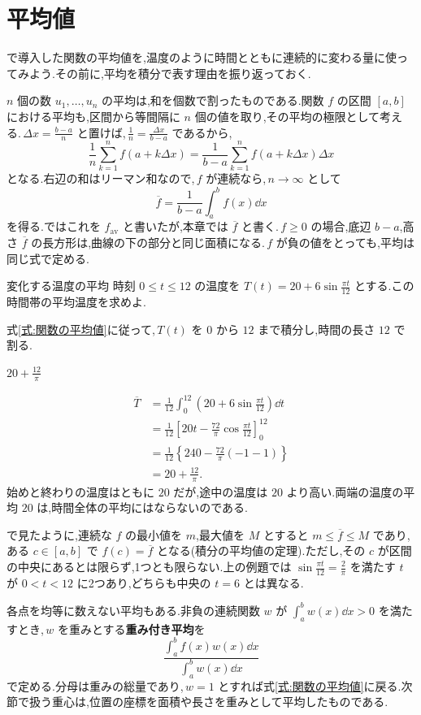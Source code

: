 \section{平均値}\label{節:関数の平均}

で導入した関数の平均値を,温度のように時間とともに連続的に変わる量に使ってみよう.その前に,平均を積分で表す理由を振り返っておく.

$n$ 個の数 $u_1,\ldots,u_n$ の平均は,和を個数で割ったものである.関数 $f$ の区間 $[a,b]$ における平均も,区間から等間隔に $n$ 個の値を取り,その平均の極限として考える.\,$\Delta x=\frac{b-a}{n}$ と置けば,\,$\frac1n=\frac{\Delta x}{b-a}$ であるから,
\[
\frac1n\sum_{k=1}^n f(a+k\Delta x)
 =\frac{1}{b-a}\sum_{k=1}^n f(a+k\Delta x)\Delta x
\]
となる.右辺の和はリーマン和なので,\,$f$ が連続なら,\,$n\to\infty$ として
\begin{equation}\label{式:関数の平均値}
\overline f=\frac{1}{b-a}\int_a^b f(x)\dd x
\end{equation}
を得る.ではこれを $f_{\mathrm{av}}$ と書いたが,本章では $\overline f$ と書く.\,$f\ge0$ の場合,底辺 $b-a$,高さ $\overline f$ の長方形は,曲線の下の部分と同じ面積になる.\,$f$ が負の値をとっても,平均は同じ式で定める.

\begin{example}{変化する温度の平均}
時刻 $0\le t\le12$ の温度を $T(t)=20+6\sin\frac{\pi t}{12}$ とする.この時間帯の平均温度を求めよ.
\end{example}

式\eqref{式:関数の平均値}に従って,\,$T(t)$ を $0$ から $12$ まで積分し,時間の長さ $12$ で割る.

$20+\frac{12}{\pi}$

\begin{align*}
\overline T
 &=\frac1{12}\int_0^{12}\left(20+6\sin\frac{\pi t}{12}\right)\dd t\\
 &=\frac1{12}\left[20t-\frac{72}{\pi}\cos\frac{\pi t}{12}\right]_0^{12}\\
 &=\frac1{12}\left\{240-\frac{72}{\pi}(-1-1)\right\}\\
 &=20+\frac{12}{\pi}.
\end{align*}
始めと終わりの温度はともに $20$ だが,途中の温度は $20$ より高い.両端の温度の平均 $20$ は,時間全体の平均にはならないのである.

で見たように,連続な $f$ の最小値を $m$,最大値を $M$ とすると $m\le\overline f\le M$ であり,ある $c\in[a,b]$ で $f(c)=\overline f$ となる(積分の平均値の定理).ただし,その $c$ が区間の中央にあるとは限らず,1つとも限らない.上の例題では $\sin\frac{\pi t}{12}=\frac2\pi$ を満たす $t$ が $0<t<12$ に2つあり,どちらも中央の $t=6$ とは異なる.

各点を均等に数えない平均もある.非負の連続関数 $w$ が $\int_a^b w(x)\dd x>0$ を満たすとき,\,$w$ を重みとする\textbf{重み付き平均}を
\[
\frac{\int_a^b f(x)w(x)\dd x}{\int_a^b w(x)\dd x}
\]
で定める.分母は重みの総量であり,\,$w=1$ とすれば式\eqref{式:関数の平均値}に戻る.次節で扱う重心は,位置の座標を面積や長さを重みとして平均したものである.

